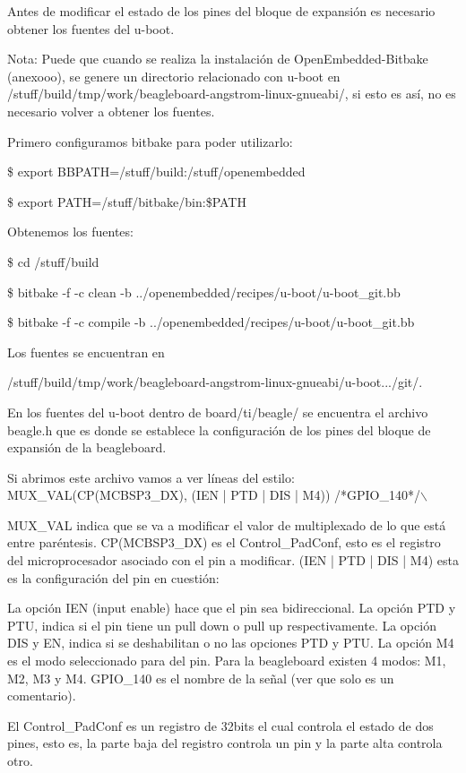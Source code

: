 Antes de modificar el estado de los pines del bloque de expansión es necesario obtener los fuentes del u-boot.

Nota: Puede que cuando se realiza la instalación de OpenEmbedded-Bitbake (anexooo), se genere un directorio relacionado con u-boot en /stuff/build/tmp/work/beagleboard-angstrom-linux-gnueabi/, si esto es así, no es necesario volver a obtener los fuentes.

Primero configuramos bitbake para poder utilizarlo:

\$ export BBPATH=/stuff/build:/stuff/openembedded

\$ export PATH=/stuff/bitbake/bin:\$PATH

Obtenemos los fuentes:

\$ cd /stuff/build

\$ bitbake -f -c clean -b ../openembedded/recipes/u-boot/u-boot\_git.bb

\$ bitbake -f -c compile -b ../openembedded/recipes/u-boot/u-boot\_git.bb

Los fuentes se encuentran en 

/stuff/build/tmp/work/beagleboard-angstrom-linux-gnueabi/u-boot.../git/.

En los fuentes del u-boot dentro de board/ti/beagle/ se encuentra el archivo beagle.h que es donde se establece la configuración de los pines del bloque de expansión de la beagleboard.

Si abrimos este archivo vamos a ver líneas del estilo: 
MUX\_VAL(CP(MCBSP3\_DX), (IEN | PTD | DIS | M4)) /*GPIO\_140*/$\backslash$ 

MUX\_VAL indica que se va a modificar el valor de multiplexado de lo que está entre paréntesis. 
CP(MCBSP3\_DX) es el Control\_PadConf, esto es el registro del microprocesador asociado con el 
pin a modificar. 
(IEN | PTD | DIS | M4) esta es la configuración del pin en cuestión: 

La opción IEN (input enable) hace que el pin sea bidireccional. 
La opción PTD y PTU, indica si el pin tiene un pull down o pull up respectivamente. 
La opción DIS y EN, indica si se deshabilitan o no las opciones PTD y PTU. 
La opción M4 es el modo seleccionado para del pin. Para la beagleboard existen 4 modos: M1, M2, M3 y M4.
GPIO\_140 es el nombre de la señal (ver que solo es un comentario). 

El Control\_PadConf es un registro de 32bits el cual controla el estado de dos pines, esto es, la parte 
baja del registro controla un pin y la parte alta controla otro. 

